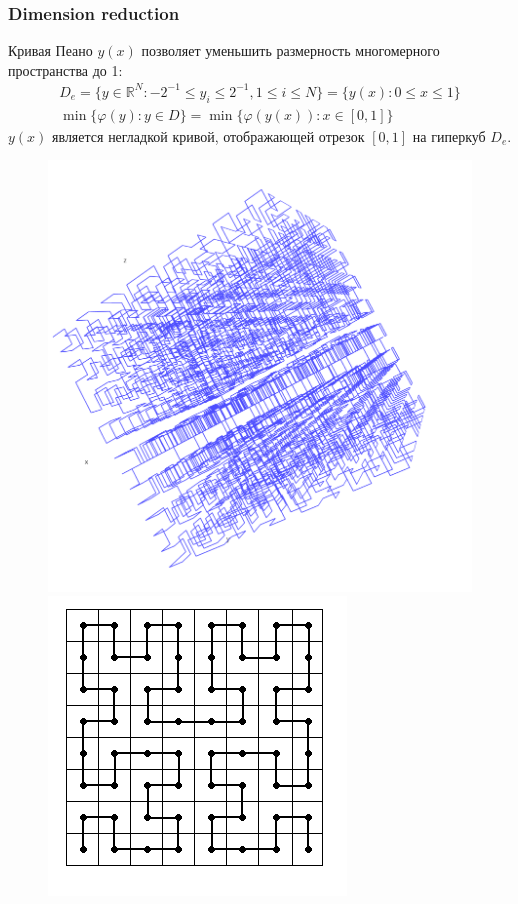 \documentclass[aspectratio=1610]{beamer}
\begin{document}
\begin{frame}
  \frametitle{Dimension reduction}
  \begin{center}
  Кривая Пеано \(y(x)\) позволяет уменьшить размерность многомерного пространства до 1:
  \begin{gather}
    D_e=\lbrace y\in \mathbb{R}^N:-2^{-1}\leqslant y_i\leqslant 2^{-1},1\leqslant i\leqslant N\rbrace=\{y(x):0\leqslant x\leqslant 1\} \nonumber \\
    \min\{\varphi(y): y\in D\}=\min\{\varphi(y(x)): x\in [0,1]\} \nonumber
  \end{gather}
  \(y(x)\) является негладкой кривой, отображающей отрезок \([0,1]\) на гиперкуб \(D_e\).
  \begin{figure}[ht]
    \includegraphics[width=.35\textwidth]{peano3d.png}
    \includegraphics[width=.35\textwidth]{peano2d.png}
  \end{figure}
\end{center}
\end{frame}
\end{document}
